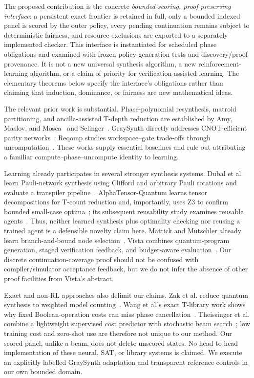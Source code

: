 \documentclass[11pt]{article}
\theoremstyle{definition}\newtheorem{definition}[theorem]{Definition}
\begin{document}
The proposed contribution is the concrete \emph{bounded-scoring, proof-preserving interface}: a persistent exact frontier is retained in full, only a bounded indexed panel is scored by the outer policy, every pending continuation remains subject to deterministic fairness, and resource exclusions are exported to a separately implemented checker. This interface is instantiated for scheduled phase obligations and examined with frozen-policy generation tests and discovery/proof provenance. It is not a new universal synthesis algorithm, a new reinforcement-learning algorithm, or a claim of priority for verification-assisted learning. The elementary theorems below specify the interface's obligations rather than claiming that induction, dominance, or fairness are new mathematical ideas.

The relevant prior work is substantial. Phase-polynomial resynthesis, matroid partitioning, and ancilla-assisted T-depth reduction are established by Amy, Maslov, and Mosca~\cite{amy2014} and Selinger~\cite{selinger2013}. GraySynth directly addresses CNOT-efficient parity networks~\cite{amy2019}; Reqomp studies workspace--gate trade-offs through uncomputation~\cite{paradis2024}. These works supply essential baselines and rule out attributing a familiar compute--phase--uncompute identity to learning.

Learning already participates in several stronger synthesis systems. Dubal et al. learn Pauli-network synthesis using Clifford and arbitrary Pauli rotations and evaluate a transpiler pipeline~\cite{dubal2025}. AlphaTensor-Quantum learns tensor decompositions for T-count reduction and, importantly, uses Z3 to confirm bounded small-case optima~\cite{ruiz2025}; its subsequent reusability study examines reusable agents~\cite{zen2026}. Thus, neither learned synthesis plus optimality checking nor reusing a trained agent is a defensible novelty claim here. Mattick and Mutschler already learn branch-and-bound node selection~\cite{mattick2024}. Vista combines quantum-program generation, staged verification feedback, and budget-aware evaluation~\cite{yu2026}. Our discrete continuation-coverage proof should not be confused with compiler/simulator acceptance feedback, but we do not infer the absence of other proof facilities from Vista's abstract.

Exact and non-RL approaches also delimit our claims. Zak et al. reduce quantum synthesis to weighted model counting~\cite{zak2025}. Wang et al.'s exact T-library work shows why fixed Boolean-operation costs can miss phase cancellation~\cite{wang2026}. Theissinger et al. combine a lightweight supervised cost predictor with stochastic beam search~\cite{theissinger2026}; low training cost and zero-shot use are therefore not unique to our method. Our scored panel, unlike a beam, does not delete unscored states. No head-to-head implementation of these neural, SAT, or library systems is claimed. We execute an explicitly labelled GraySynth adaptation and transparent reference controls in our own bounded domain.
\end{document}
